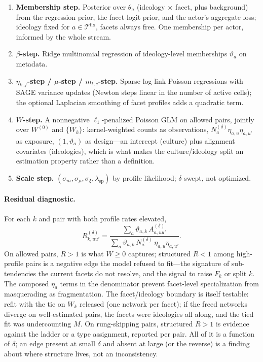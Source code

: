\documentclass[11pt]{article}
\newcommand{\Tcal}{\mathcal{T}}
\newcommand{\1}{\mathbb{1}}
\begin{document}
\begin{enumerate}
  \item \textbf{Membership step.} Posterior over $\theta_a$ (ideology $\times$ facet, plus background) from the regression prior, the facet-logit prior, and the actor's aggregate loss; ideology fixed for $a\in\Tcal^{\text{fix}}$, facets always free. One membership per actor, informed by the whole stream.
  \item \textbf{$\beta$-step.} Ridge multinomial regression of ideology-level memberships $\vartheta_a$ on metadata.
  \item \textbf{$\eta_{k,f}$-step / $\mu$-step / $m_{t,c}$-step.} Sparse log-link Poisson regressions with SAGE variance updates (Newton steps linear in the number of active cells); the optional Laplacian smoothing of facet profiles adds a quadratic term.
  \item \textbf{$W$-step.} A nonnegative $\ell_1$-penalized Poisson GLM on allowed pairs, jointly over $W^{(0)}$ and $\{W_k\}$: kernel-weighted counts as observations, $N^{(\delta)}_a\eta_{a,u}\eta_{a,u'}$ as exposure, $(1,\vartheta_a)$ as design---an intercept (culture) plus alignment covariates (ideologies), which is what makes the culture/ideology split an estimation property rather than a definition.
  \item \textbf{Scale step.} $(\sigma_m,\sigma_\mu,\sigma_\xi,\lambda_{\text{sp}})$ by profile likelihood; $\delta$ swept, not optimized.
\end{enumerate}

\paragraph{Residual diagnostic.} For each $k$ and pair with both profile rates elevated,
\[
  R^{(\delta)}_{k,uu'}=\frac{\sum_a\vartheta_{a,k}\,A^{(\delta)}_{a,uu'}}{\sum_a\vartheta_{a,k}\,N^{(\delta)}_a\,\eta_{a,u}\eta_{a,u'}}.
\]
On allowed pairs, $R>1$ is what $W\ge0$ captures; structured $R<1$ among high-profile pairs is a negative edge the model refused to fit---the signature of sub-tendencies the current facets do not resolve, and the signal to raise $F_k$ or split $k$. The composed $\eta_a$ terms in the denominator prevent facet-level specialization from masquerading as fragmentation. The facet/ideology boundary is itself testable: refit with the tie on $W_k$ released (one network per facet); if the freed networks diverge on well-estimated pairs, the facets were ideologies all along, and the tied fit was undercounting $M$. On rung-skipping pairs, structured $R>1$ is evidence against the ladder or a type assignment, reported per pair. All of it is a function of $\delta$; an edge present at small $\delta$ and absent at large (or the reverse) is a finding about where structure lives, not an inconsistency.
\end{document}
